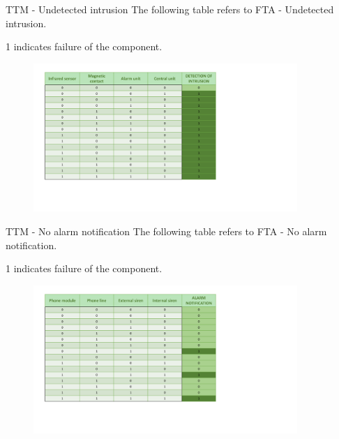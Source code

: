 \begin{frame}{TTM - Undetected intrusion}
  \vskip 0.3cm
    The following table refers to FTA - Undetected intrusion.

    1 indicates failure of the component.
    \vskip 0.05cm
    \begin{figure}[ht!]
      \includegraphics[width=100mm]{images/ttm_undetected_intrusion.pdf}
      \label{fig:ttm_undetected_intrusion}
    \end{figure}
\end{frame}

\begin{frame}{TTM - No alarm notification}
  \vskip 0.3cm
    The following table refers to FTA - No alarm notification.

    1 indicates failure of the component.
    \vskip 0.05cm
    \begin{figure}[ht!]
      \includegraphics[width=100mm]{images/ttm_alarm_notification.pdf}
      \label{fig:ttm_alarm_notification}
    \end{figure}
\end{frame}

